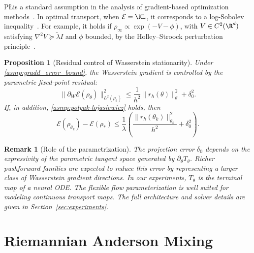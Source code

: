 \documentclass{article} %
\newtheorem{proposition}{Proposition}[section]
\numberwithin{equation}{subsection}
\numberwithin{theorem}{section}
\newcommand{\cE}{\mathcal{E}}
\newtheorem{remark}{Remark}[section]
\begin{document}
P\L is a standard assumption in the analysis of gradient-based optimization
methods~\cite{karimi2016linear,zhu2025convergence,boufadene2312global}.
In optimal transport, when $\cE=\KL$, it corresponds to a log-Sobolev
inequality~\cite[Chapter~9.2]{villani2021topics}. For example, it holds if
$\rho_\infty\propto \exp(-V-\phi)$, with $V\in C^2(\R^d)$ satisfying
$\nabla^2 V\succeq \tilde\lambda I$ and $\phi$ bounded, by the Holley--Stroock
perturbation principle~\cite{holley1986logarithmic}.

\begin{proposition}[Residual control of Wasserstein stationarity]
\label{prop:energy_decay}
Under \autoref{asmp:gradd_error_bound}, the Wasserstein gradient is controlled
by the parametric fixed-point residual:
\begin{equation}\label{eq:projected_gradient_bound}
    \|\partial_W\cE(\rho_\theta)\|_{L^2(\rho_\theta)}^2
    \leq
    \frac{1}{h^2}
    \|r_h(\theta)\|_\theta^2
    +
    \delta_0^2.
\end{equation} If, in addition,
\autoref{asmp:polyak-lojasiewicz} holds, then
\begin{equation}
    \cE(\rho_{\theta_k})-\cE(\rho_*)
    \leq
    \frac{1}{\lambda}
    \left(
        \frac{\|r_h(\theta_k)\|_{\theta_k}^2}{h^2}
        +
        \delta_0^2
    \right).
\end{equation}

\end{proposition}
\begin{remark}[Role of the parametrization]
The projection error $\delta_0$ depends on the expressivity of the
parametric tangent space generated by $\partial_\theta T_\theta$. Richer
pushforward families are expected to reduce this error by representing a larger
class of Wasserstein gradient directions. In our experiments, 
$T_\theta$ is the terminal map of a neural ODE. The flexible flow
parameterization is well suited for modeling continuous transport maps. The
full architecture and solver details are given in
Section~\ref{sec:experiments}.
\end{remark}

\section{Riemannian Anderson Mixing}\label{sec:RAM}
 
\end{document}
